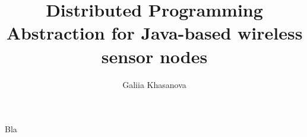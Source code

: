 \documentclass[msc, openright, a4paper]{TNthesis}
\title{Distributed Programming Abstraction for Java-based wireless sensor nodes}
\author{Galiia Khasanova}
\begin{document}
 

\begin{preliminary}
\maketitle 
\begin{acknowledgements}
Bla
\end{acknowledgements}
\standarddeclaration
\tableofcontents
\listoffigures
\listoftables
\lstlistoflistings
\end{preliminary}  






\end{document}
